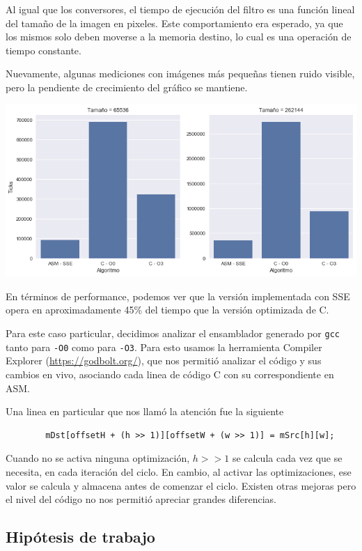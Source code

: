Al igual que los conversores, el tiempo de ejecución del filtro es una función lineal del tamaño de la imagen en pixeles. Este comportamiento era esperado, ya que los mismos solo deben moverse a la memoria destino, lo cual es una operación de tiempo constante.

Nuevamente, algunas mediciones con imágenes más pequeñas tienen ruido visible, pero la pendiente de crecimiento del gráfico se mantiene.

\begin{center}
	\includegraphics[scale=0.5]{img/fourCombine_CvsASMvsO3_bars.png}
\end{center}

En términos de performance, podemos ver que la versión implementada con SSE opera en aproximadamente 45\% del tiempo que la versión optimizada de C.


Para este caso particular, decidimos analizar el ensamblador generado por \texttt{gcc} tanto para \texttt{-O0} como para \texttt{-O3}. Para esto usamos la herramienta Compiler Explorer (\url{https://godbolt.org/}), que nos permitió analizar el código y sus cambios en vivo, asociando cada linea de código C con su correspondiente en ASM.

Una linea en particular que nos llamó la atención fue la siguiente

\begin{lstlisting}
		mDst[offsetH + (h >> 1)][offsetW + (w >> 1)] = mSrc[h][w];
\end{lstlisting}

Cuando no se activa ninguna optimización, $h >> 1$ se calcula cada vez que se necesita, en cada iteración del ciclo. En cambio, al activar las optimizaciones, ese valor se calcula y almacena antes de comenzar el ciclo. Existen otras mejoras pero el nivel del código no nos permitió apreciar grandes diferencias.

\subsection{Hipótesis de trabajo}

